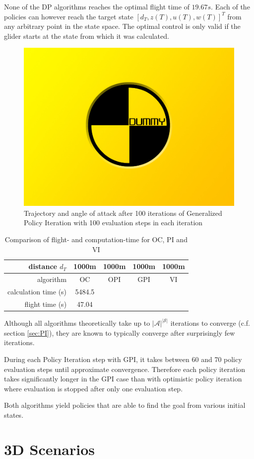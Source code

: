 None of the DP algorithms reaches the optimal flight time of $19.67s$. Each of the policies can however reach the target state $[d_T,z(T),u(T),w(T)]^T$ from any arbitrary point in the state space. The optimal control is only valid if the glider starts at the state from which it was calculated.

\begin{figure}[h]
	\includegraphics[width=\textwidth]{src/pics/dummy.jpg}
	\caption{Trajectory and angle of attack after 100 iterations of Generalized Policy Iteration with 100 evaluation steps in each iteration}
	\label{fig:2d_flighttimes_GPI_OPI}
\end{figure}

\begin{table}[h]
	\begin{center}
		\begin{tabular}{r|c c c c}
			distance $d_T$ & 1000m & 1000m & 1000m & 1000m \\ \hline 
			algorithm & OC & OPI & GPI & VI \\
			calculation time (s) & 5484.5& & & \\
			flight time (s) & 47.04 & & &
		\end{tabular}
		\caption{Comparison of flight- and computation-time for OC, PI and VI}
		\label{tab:2d_flighttimes}
	\end{center}
\end{table}

Although all algorithms theoretically take up to $|\mathcal{A}|^{|\mathcal{S}|}$ iterations to converge (c.f. section \ref{sec:PI}), they are known to typically converge after surprisingly few iterations.

During each Policy Iteration step with GPI, it takes between 60 and 70 policy evaluation steps until approximate convergence. Therefore each policy iteration takes significantly longer in the GPI case than with optimistic policy iteration where evaluation is stopped after only one evaluation step.

Both algorithms yield policies that are able to find the goal from various initial states. 

\section{3D Scenarios}
\label{sec:results3d}